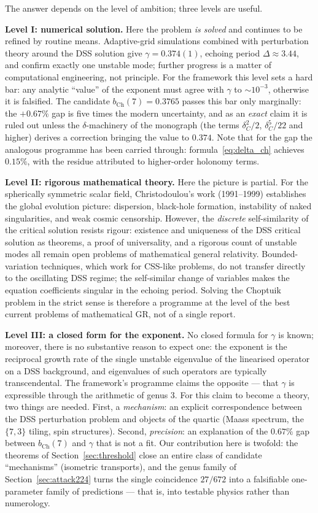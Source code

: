 \documentclass[11pt,a4paper]{article}
\theoremstyle{definition}
\theoremstyle{remark}
\begin{document}
The answer depends on the level of ambition; three levels are useful.

\textbf{Level I: numerical solution.} Here the problem \emph{is solved} and
continues to be refined by routine means. Adaptive-grid simulations combined
with perturbation theory around the DSS solution give $\gamma = 0.374(1)$,
echoing period $\Delta \approx 3.44$, and confirm exactly one unstable mode;
further progress is a matter of computational engineering, not principle.
For the framework this level sets a hard bar: any analytic ``value'' of the
exponent must agree with $\gamma$ to $\sim 10^{-3}$, otherwise it is
falsified. The candidate $b_{\mathrm{Ch}}(7) = 0.3765$ passes this bar only
marginally: the $+0.67\%$ gap is five times the modern uncertainty, and as
an \emph{exact} claim it is ruled out unless the $\delta$-machinery of the
monograph (the terms $\delta_C^2/2$, $\delta_C^5/22$ and higher) derives a
correction bringing the value to $0.374$. Note that for the gap the
analogous programme has been carried through: formula~\eqref{eq:delta_ch}
achieves $0.15\%$, with the residue attributed to higher-order holonomy
terms.

\textbf{Level II: rigorous mathematical theory.} Here the picture is partial.
For the spherically symmetric scalar field, Christodoulou's work
(1991--1999) establishes the global evolution picture: dispersion, black-hole
formation, instability of naked singularities, and weak cosmic censorship.
However, the \emph{discrete} self-similarity of the critical solution resists
rigour: existence and uniqueness of the DSS critical solution as theorems,
a proof of universality, and a rigorous count of unstable modes all remain
open problems of mathematical general relativity. Bounded-variation
techniques, which work for CSS-like problems, do not transfer directly to
the oscillating DSS regime; the self-similar change of variables makes the
equation coefficients singular in the echoing period. Solving the Choptuik
problem in the strict sense is therefore a programme at the level of the
best current problems of mathematical GR, not of a single report.

\textbf{Level III: a closed form for the exponent.} No closed formula for
$\gamma$ is known; moreover, there is no substantive reason to expect one:
the exponent is the reciprocal growth rate of the single unstable eigenvalue
of the linearised operator on a DSS background, and eigenvalues of such
operators are typically transcendental. The framework's programme claims the
opposite --- that $\gamma$ is expressible through the arithmetic of genus 3.
For this claim to become a theory, two things are needed. First, a
\emph{mechanism}: an explicit correspondence between the DSS perturbation
problem and objects of the quartic (Maass spectrum, the $\{7,3\}$ tiling,
spin structures). Second, \emph{precision}: an explanation of the $0.67\%$
gap between $b_{\mathrm{Ch}}(7)$ and $\gamma$ that is not a fit. Our
contribution here is twofold: the theorems of Section~\ref{sec:threshold}
close an entire class of candidate ``mechanisms'' (isometric transports),
and the genus family of Section~\ref{sec:attack224} turns the single
coincidence $27/672$ into a falsifiable one-parameter family of predictions
--- that is, into testable physics rather than numerology.
\end{document}
